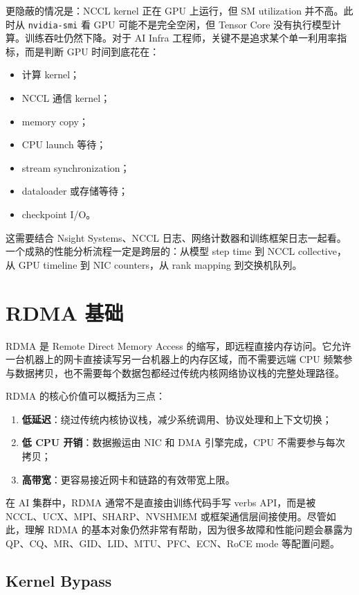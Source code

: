 更隐蔽的情况是：NCCL kernel 正在 GPU 上运行，但 SM utilization 并不高。此时从 \texttt{nvidia-smi} 看 GPU 可能不是完全空闲，但 Tensor Core 没有执行模型计算。训练吞吐仍然下降。对于 AI Infra 工程师，关键不是追求某个单一利用率指标，而是判断 GPU 时间到底花在：

\begin{itemize}
  \item 计算 kernel；
  \item NCCL 通信 kernel；
  \item memory copy；
  \item CPU launch 等待；
  \item stream synchronization；
  \item dataloader 或存储等待；
  \item checkpoint I/O。
\end{itemize}

这需要结合 Nsight Systems、NCCL 日志、网络计数器和训练框架日志一起看。一个成熟的性能分析流程一定是跨层的：从模型 step time 到 NCCL collective，从 GPU timeline 到 NIC counters，从 rank mapping 到交换机队列。

\section{RDMA 基础}
\label{sec:rdma-basics}

RDMA 是 Remote Direct Memory Access 的缩写，即远程直接内存访问。它允许一台机器上的网卡直接读写另一台机器上的内存区域，而不需要远端 CPU 频繁参与数据拷贝，也不需要每个数据包都经过传统内核网络协议栈的完整处理路径。

RDMA 的核心价值可以概括为三点：

\begin{enumerate}
  \item \textbf{低延迟}：绕过传统内核协议栈，减少系统调用、协议处理和上下文切换；
  \item \textbf{低 CPU 开销}：数据搬运由 NIC 和 DMA 引擎完成，CPU 不需要参与每次拷贝；
  \item \textbf{高带宽}：更容易接近网卡和链路的有效带宽上限。
\end{enumerate}

在 AI 集群中，RDMA 通常不是直接由训练代码手写 verbs API，而是被 NCCL、UCX、MPI、SHARP、NVSHMEM 或框架通信层间接使用。尽管如此，理解 RDMA 的基本对象仍然非常有帮助，因为很多故障和性能问题会暴露为 QP、CQ、MR、GID、LID、MTU、PFC、ECN、RoCE mode 等配置问题。

\subsection{Kernel Bypass}
\label{subsec:kernel-bypass}

